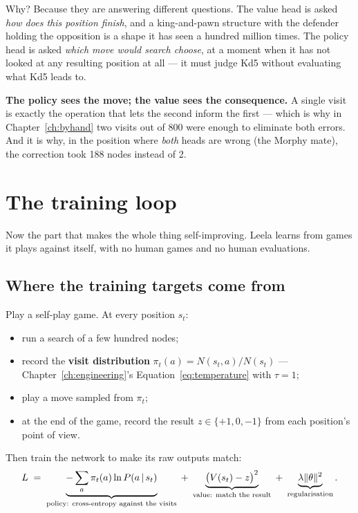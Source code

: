 Why? Because they are answering different questions. The value head is asked \emph{how does
this position finish}, and a king-and-pawn structure with the defender holding the opposition
is a shape it has seen a hundred million times. The policy head is asked \emph{which move
would search choose}, at a moment when it has not looked at any resulting position at all ---
it must judge Kd5 without evaluating what Kd5 leads to.

\begin{keyidea}
\textbf{The policy sees the move; the value sees the consequence.} A single visit is exactly
the operation that lets the second inform the first --- which is why in
Chapter~\ref{ch:byhand} two visits out of 800 were enough to eliminate both errors. And it is
why, in the position where \emph{both} heads are wrong (the Morphy mate), the correction took
188 nodes instead of 2.
\end{keyidea}

\section{The training loop}

Now the part that makes the whole thing self-improving. Leela learns from games it plays
against itself, with no human games and no human evaluations.

\subsection{Where the training targets come from}

Play a self-play game. At every position $s_t$:

\begin{itemize}
\item run a search of a few hundred nodes;
\item record the \textbf{visit distribution} $\pi_t(a) = N(s_t,a)/N(s_t)$ ---
  Chapter~\ref{ch:engineering}'s Equation~\eqref{eq:temperature} with $\tau = 1$;
\item play a move sampled from $\pi_t$;
\item at the end of the game, record the result $z \in \{+1, 0, -1\}$ from each position's
  point of view.
\end{itemize}

Then train the network to make its raw outputs match:
\begin{equation}
  \label{eq:azloss}
  L \;=\;
  \underbrace{-\sum_a \pi_t(a)\ln P(a\,|\, s_t)}_{\text{policy: cross-entropy against the visits}}
  \;+\;
  \underbrace{\bigl(V(s_t) - z\bigr)^2}_{\text{value: match the result}}
  \;+\;
  \underbrace{\lambda\lVert\theta\rVert^2}_{\text{regularisation}} .
\end{equation}

